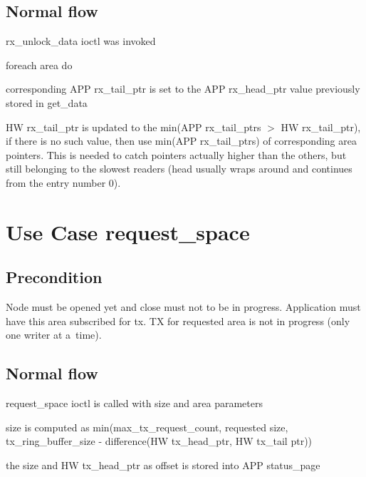   \subsection{Normal flow}
  \begin{CompactEnumerate}
    \item rx\_unlock\_data ioctl was invoked
    \item foreach area do
    \begin{CompactEnumerate}
      \item corresponding APP rx\_tail\_ptr is set to the APP rx\_head\_ptr
        value previously stored in get\_data
      \item HW rx\_tail\_ptr is updated to the min(APP rx\_tail\_ptrs $>$ HW
        rx\_tail\_ptr), if there is no such value, then use min(APP
	rx\_tail\_ptrs) of corresponding area pointers. This is needed to
	catch pointers actually higher than the others, but still belonging to
	the slowest readers (head usually wraps around and continues from the
	entry number 0).
    \end{CompactEnumerate}
  \end{CompactEnumerate}

  \section{Use Case request\_space}

  \subsection{Precondition}
  Node must be opened yet and close must not to be in progress.
  Application must have this area subscribed for tx.
  TX for requested area is not in progress (only one writer at a~time).

  \subsection{Normal flow}
  \begin{CompactEnumerate}
    \item request\_space ioctl is called with size and area parameters
    \item size is computed as min(max\_tx\_request\_count, requested size,
      tx\_ring\_buffer\_size - difference(HW tx\_head\_ptr, HW tx\_tail ptr))
    \item the size and HW tx\_head\_ptr as offset is stored into APP
      status\_page
  \end{CompactEnumerate}

